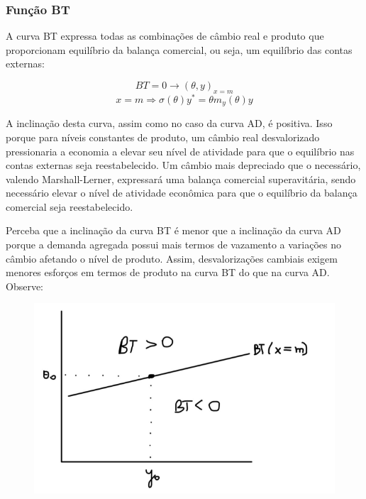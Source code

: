 \documentclass[a4paper,12pt]{article}[abntex2]
\begin{document}
\subsubsection{\textbf{Função BT}}
A curva BT expressa todas as combinações de câmbio real e produto que proporcionam equilíbrio da balança comercial, ou seja, um equilíbrio das contas externas:

\[
BT = 0 \rightarrow (\theta, y)_{x = m}
\]
\[
x = m \Rightarrow \sigma(\theta)y^* = \theta m_y(\theta)y
\]

A inclinação desta curva, assim como no caso da curva AD, é positiva. Isso porque para níveis constantes de produto, um câmbio real desvalorizado pressionaria a economia a elevar seu nível de atividade para que o equilíbrio nas contas externas seja reestabelecido. Um câmbio mais depreciado que o necessário, valendo Marshall-Lerner, expressará uma balança comercial superavitária, sendo necessário elevar o nível de atividade econômica para que o equilíbrio da balança comercial seja reestabelecido.

Perceba que a inclinação da curva BT é menor que a inclinação da curva AD porque a demanda agregada possui mais termos de vazamento a variações no câmbio afetando o nível de produto. Assim, desvalorizações cambiais exigem menores esforços em termos de produto na curva BT do que na curva AD. Observe:


\begin{figure}[H]
    \centering
    \includegraphics[width=0.7\linewidth]{Imagens/a26i5.png}
\end{figure}
\end{document}
